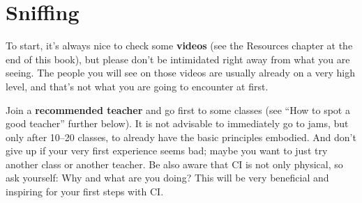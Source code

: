 \section{Sniffing}\label{sec:sniffing}

To start, it's always nice to check some \textbf{videos} (see the Resources chapter at the end of this book), but please don't be intimidated right away from what you are seeing.
The people you will see on those videos are usually already on a very high level, and that's not what you are going to encounter at first.

Join a \textbf{recommended teacher} and go first to some classes (see ``How to spot a good teacher'' further below).
It is not advisable to immediately go to jams, but only after 10--20 classes, to already have the basic principles embodied.
And don't give up if your very first experience seems bad; maybe you want to just try another class or another teacher.
Be also aware that CI is not only physical, so ask yourself: Why and what are you doing?
This will be very beneficial and inspiring for your first steps with CI\@.
